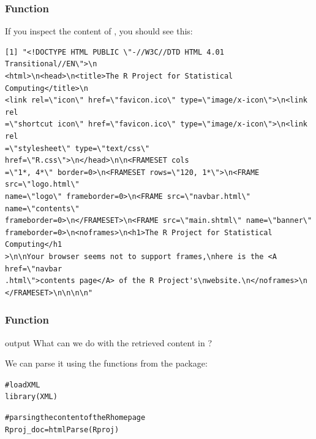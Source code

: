 \documentclass{beamer}\usepackage[]{graphicx}\usepackage[]{color}
\makeatletter
\newcommand{\hlcom}[1]{\textcolor[rgb]{0.588,0.588,0.588}{#1}}%
\newcommand{\hlstd}[1]{\textcolor[rgb]{0.196,0.196,0.196}{#1}}%
\newcommand{\hlkwb}[1]{\textcolor[rgb]{0.627,0,0.314}{#1}}%
\newcommand{\hlkwd}[1]{\textcolor[rgb]{0.78,0.227,0.412}{#1}}%
\newenvironment{kframe}{%
 \def\at@end@of@kframe{}%
 \ifinner\ifhmode%
  \def\at@end@of@kframe{\end{minipage}}%
  \begin{minipage}{\columnwidth}%
 \fi\fi%
 \def\FrameCommand##1{\hskip\@totalleftmargin \hskip-\fboxsep
 \colorbox{shadecolor}{##1}\hskip-\fboxsep
     \hskip-\linewidth \hskip-\@totalleftmargin \hskip\columnwidth}%
 \MakeFramed {\advance\hsize-\width
   \@totalleftmargin\z@ \linewidth\hsize
   \@setminipage}}%
 {\par\unskip\endMakeFramed%
 \at@end@of@kframe}
\newenvironment{knitrout}{}{} %
\makeatother
\begin{document}

\begin{frame}[fragile]
\frametitle{Function }

If you inspect the content of , you should see this:

{\scriptsize
\begin{verbatim}
[1] "<!DOCTYPE HTML PUBLIC \"-//W3C//DTD HTML 4.01 Transitional//EN\">\n
<html>\n<head>\n<title>The R Project for Statistical Computing</title>\n
<link rel=\"icon\" href=\"favicon.ico\" type=\"image/x-icon\">\n<link rel
=\"shortcut icon\" href=\"favicon.ico\" type=\"image/x-icon\">\n<link rel
=\"stylesheet\" type=\"text/css\" href=\"R.css\">\n</head>\n\n<FRAMESET cols
=\"1*, 4*\" border=0>\n<FRAMESET rows=\"120, 1*\">\n<FRAME src=\"logo.html\" 
name=\"logo\" frameborder=0>\n<FRAME src=\"navbar.html\" name=\"contents\" 
frameborder=0>\n</FRAMESET>\n<FRAME src=\"main.shtml\" name=\"banner\" 
frameborder=0>\n<noframes>\n<h1>The R Project for Statistical Computing</h1
>\n\nYour browser seems not to support frames,\nhere is the <A href=\"navbar
.html\">contents page</A> of the R Project's\nwebsite.\n</noframes>\n
</FRAMESET>\n\n\n\n"
\end{verbatim}
}

\end{frame}


\begin{frame}[fragile]
\frametitle{Function }

\begin{block}{ output}
What can we do with the retrieved content in ? 

We can parse it using the functions from the  package:
\end{block}

\begin{knitrout}\tiny
{}\color{fgcolor}\begin{kframe}
\begin{alltt}
\hlcom{# load XML}
\hlkwd{library}\hlstd{(XML)}

\hlcom{# parsing the content of the R homepage}
\hlstd{Rproj_doc} \hlkwb{=} \hlkwd{htmlParse}\hlstd{(Rproj)}
\end{alltt}
\end{kframe}
\end{knitrout}

\begin{knitrout}\tiny
{}\color{fgcolor}\begin{kframe}


{\ttfamily\noindent\itshape\color{messagecolor}{\#\# Loading required package: methods}}\end{kframe}
\end{knitrout}

\end{frame}
\end{document}
